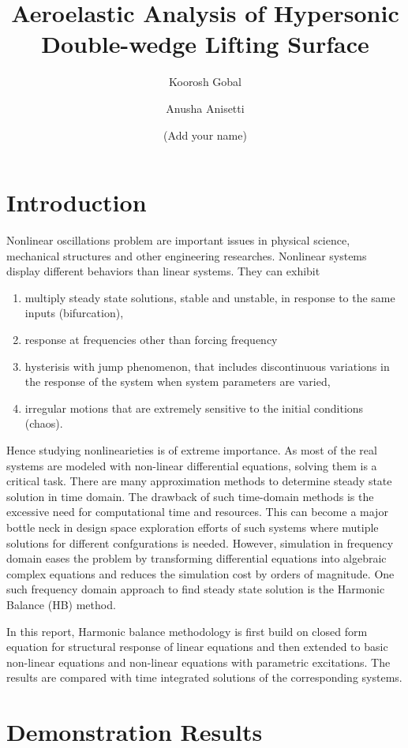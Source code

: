 \documentclass[12pt, a4paper]{extarticle}
\title{Aeroelastic Analysis of Hypersonic Double-wedge Lifting Surface}
\author[1]{Koorosh Gobal}
\author[1]{Anusha Anisetti}
\author[1]{(Add your name)}
\affil[1]{Department of Mechanical and Materials Engineering, Wright State University}
\date{} %
\begin{document}
\maketitle

\abstract{}
\section{Introduction}
{Nonlinear oscillations problem are important issues in physical science, mechanical structures and other engineering researches. Nonlinear systems display different behaviors than linear systems. They can exhibit
\begin{enumerate}  
\item  multiply steady state solutions, stable and unstable, in response to the same inputs (bifurcation),
\item  response at frequencies other than forcing frequency
\item  hysterisis with jump phenomenon, that includes discontinuous variations in the response of the system when system parameters are varied,
\item  irregular motions that are extremely sensitive to the initial conditions (chaos).
\end{enumerate}

Hence studying nonlinearieties is of extreme importance. As most of the real systems are modeled with non-linear differential equations, solving them is a critical task. There are many approximation methods to determine steady state solution in time domain. The drawback of such time-domain methods is the excessive need for computational time and resources. This can become a major bottle neck in design space exploration efforts of such systems where mutiple solutions
for different confgurations is needed. However, simulation in frequency domain eases the problem by transforming differential equations into algebraic complex equations and reduces the simulation cost by orders of magnitude. One such frequency domain approach to find steady state solution is the Harmonic Balance (HB) method. 

In this report, Harmonic balance methodology is first build on closed form equation for structural response of linear equations and then extended to basic non-linear equations and non-linear equations with parametric excitations. The results are compared with time integrated solutions of the corresponding systems.}
\section{Demonstration Results}
\end{document}
